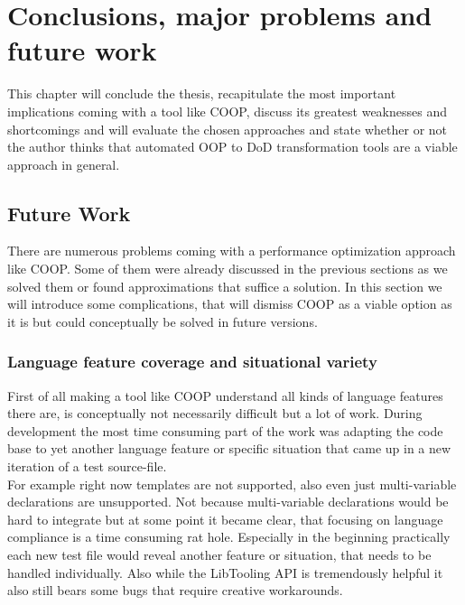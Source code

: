 \chapter{Conclusions, major problems and future work}
This chapter will conclude the thesis, recapitulate the most important implications coming with a tool like COOP, discuss its greatest weaknesses and shortcomings and will evaluate the chosen approaches and state whether or not the author thinks that automated OOP to DoD transformation tools are a viable approach in general.

\section{Future Work}\label{future_work}
There are numerous problems coming with a performance optimization approach like COOP. Some of them were already discussed in the previous sections as we solved them or found approximations that suffice a solution. In this section we will introduce some complications, that will dismiss COOP as a viable option as it is but could conceptually be solved in future versions.

\subsection{Language feature coverage and situational variety}
First of all making a tool like COOP understand all kinds of language features there are, is conceptually not necessarily difficult but a lot of work. During development the most time consuming part of the work was adapting the code base to yet another language feature or specific situation that came up in a new iteration of a test source-file.\\
For example right now templates are not supported, also even just multi-variable declarations are unsupported. Not because multi-variable declarations would be hard to integrate but at some point it became clear, that focusing on language compliance is a time consuming rat hole. Especially in the beginning practically each new test file would reveal another feature or situation, that needs to be handled individually. Also while the LibTooling API is tremendously helpful it also still bears some bugs that require creative workarounds.

